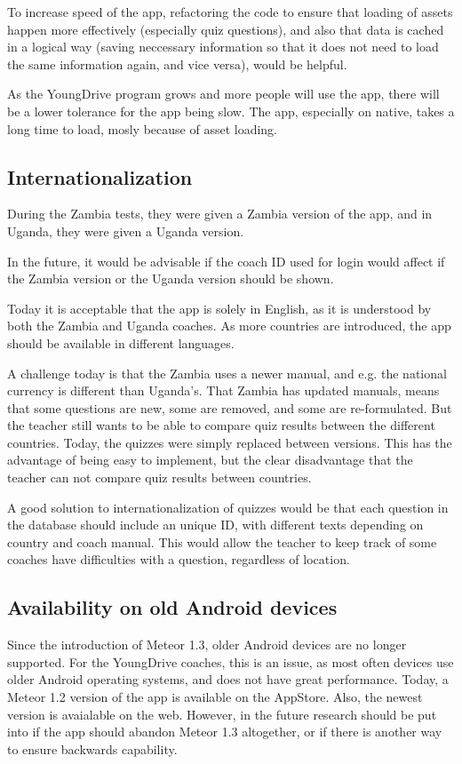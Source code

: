 To increase speed of the app, refactoring the code to ensure that loading of assets happen more effectively (especially quiz questions), and also that data is cached in a logical way (saving neccessary information so that it does not need to load the same information again, and vice versa), would be helpful.

As the YoungDrive program grows and more people will use the app, there will be a lower tolerance for the app being slow. The app, especially on native, takes a long time to load, mosly because of asset loading.

\subsection{Internationalization}
During the Zambia tests, they were given a Zambia version of the app, and in Uganda, they were given a Uganda version.

In the future, it would be advisable if the coach ID used for login would affect if the Zambia version or the Uganda version should be shown.

Today it is acceptable that the app is solely in English, as it is understood by both the Zambia and Uganda coaches. As more countries are introduced, the app should be available in different languages.

A challenge today is that the Zambia uses a newer manual, and e.g. the national currency is different than Uganda's. That Zambia has updated manuals, means that some questions are new, some are removed, and some are re-formulated. But the teacher still wants to be able to compare quiz results between the different countries. Today, the quizzes were simply replaced between versions. This has the advantage of being easy to implement, but the clear disadvantage that the teacher can not compare quiz results between countries.

A good solution to internationalization of quizzes would be that each question in the database should include an unique ID, with different texts depending on country and coach manual. This would allow the teacher to keep track of some coaches have difficulties with a question, regardless of location.

\subsection{Availability on old Android devices}
Since the introduction of Meteor 1.3, older Android devices are no longer supported. For the YoungDrive coaches, this is an issue, as most often devices use older Android operating systems, and does not have great performance. Today, a Meteor 1.2 version of the app is available on the AppStore. Also, the newest version is avaialable on the web. However, in the future research should be put into if the app should abandon Meteor 1.3 altogether, or if there is another way to ensure backwards capability.

